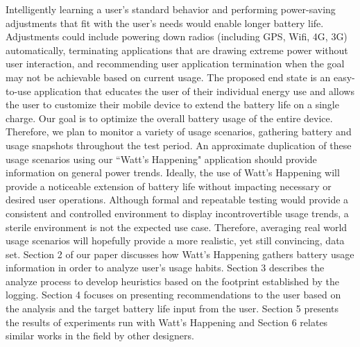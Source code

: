 Intelligently learning a user's standard behavior and performing power-saving adjustments that fit with the user's needs would enable longer battery life. 
Adjustments could include powering down radios (including GPS, Wifi, 4G, 3G) automatically, terminating applications that are drawing extreme power without user interaction, and recommending user application termination when the goal may not be achievable based on current usage. 
The proposed end state is an easy-to-use application that educates the user of their individual energy use and allows the user to customize their mobile device to extend the battery life on a single charge.
Our goal is to optimize the overall battery usage of the entire device. 
Therefore, we plan to monitor a variety of usage scenarios, gathering battery and usage snapshots throughout the test period. 
An approximate duplication of these usage scenarios using our ``Watt's Happening" application should provide information on general power trends. 
Ideally, the use of Watt's Happening will provide a noticeable extension of battery life without impacting necessary or desired user operations.  
Although formal and repeatable testing would provide a consistent and controlled environment to display incontrovertible usage trends, a sterile environment is not the expected use case. 
Therefore, averaging real world usage scenarios will hopefully provide a more realistic, yet still convincing, data set.
Section 2 of our paper discusses how Watt's Happening gathers battery usage information in order to analyze user's usage habits.  
Section 3 describes the analyze process to develop heuristics based on the footprint established by the logging.  
Section 4 focuses on presenting recommendations to the user based on the analysis and the target battery life input from the user.  
Section 5 presents the results of experiments run with Watt's Happening and Section 6 relates similar works in the field by other designers.
